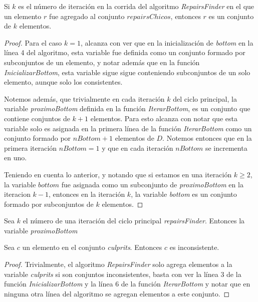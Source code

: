 \documentclass[11pt,a4paper,twoside]{tesis}
\begin{document}
\begin{lemma}\label{lema_bottom_k_elementos}
Si $k$ es el número de iteración en la corrida del algoritmo \textit{RepairsFinder} en el que un elemento $r$ fue agregado al conjunto $repairsChicos$, entonces $r$ es un conjunto de $k$ elementos. 
\end{lemma}

\begin{proof}
Para el caso $k=1$, alcanza con ver que en la inicialización de \textit{bottom} en la línea 4 del algoritmo, esta variable fue definida como un conjunto formado por subconjuntos de un elemento, y notar además que en la función \textit{InicializarBottom}, esta variable sigue sigue conteniendo subconjuntos de un solo elemento, aunque solo los consistentes.

Notemos además, que trivialmente en cada iteración $k$ del ciclo principal, la variable \textit{proximoBottom} definida en la función \textit{IterarBottom}, es un conjunto que contiene conjuntos de $k+1$ elementos. Para esto alcanza con notar que esta variable solo es asignada en la primera línea de la función \textit{IterarBottom} como un conjunto formado por $nBottom + 1$ elementos de $D$. Notemos entonces que en la primera iteración $nBottom = 1$ y que en cada iteración $nBottom$ se incrementa en uno.

Teniendo en cuenta lo anterior, y notando que si estamos en una iteración $k\geq 2$, la variable $bottom$ fue asignada como un subconjunto de \textit{proximoBottom} en la iteracion $k-1$, entonces en la iteración $k$, la variable \textit{bottom} es un conjunto formado por subconjuntos de $k$ elementos.
\end{proof}

\begin{lemma}\label{lema_proximo_bottom_k+1_elementos}
Sea $k$ el número de una iteración del ciclo principal \textit{repairsFinder}. Entonces la variable \textit{proximoBottom} 
\end{lemma}

\begin{lemma}\label{culprits_inconsistentes}
Sea $c$ un elemento en el conjunto \textit{culprits}. Entonces $c$ es inconsistente.
\end{lemma}

\begin{proof}
Trivialmente, el algoritmo \textit{RepairsFinder} solo agrega elementos a la variable \textit{culprits} si son conjuntos inconsistentes, basta con ver la línea 3 de la función \textit{InicializarBottom} y la línea 6 de la función \textit{IterarBottom} y notar que en ninguna otra línea del algoritmo se agregan elementos a este conjunto.
\end{proof}
\end{document}
